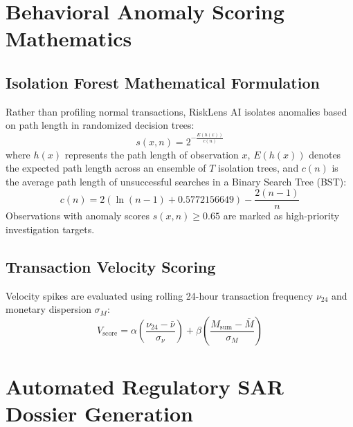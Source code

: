 \documentclass[12pt,a4paper]{report}
\begin{document}
\chapter{Behavioral Anomaly Scoring Mathematics}

\section{Isolation Forest Mathematical Formulation}
Rather than profiling normal transactions, RiskLens AI isolates anomalies based on path length in randomized decision trees:
\begin{equation}
s(x, n) = 2^{-\frac{E(h(x))}{c(n)}}
\end{equation}
where $h(x)$ represents the path length of observation $x$, $E(h(x))$ denotes the expected path length across an ensemble of $T$ isolation trees, and $c(n)$ is the average path length of unsuccessful searches in a Binary Search Tree (BST):
\begin{equation}
c(n) = 2 \left( \ln(n - 1) + 0.5772156649 \right) - \frac{2(n - 1)}{n}
\end{equation}
Observations with anomaly scores $s(x, n) \ge 0.65$ are marked as high-priority investigation targets.

\section{Transaction Velocity Scoring}
Velocity spikes are evaluated using rolling 24-hour transaction frequency $\nu_{24}$ and monetary dispersion $\sigma_M$:
\begin{equation}
V_{\text{score}} = \alpha \left( \frac{\nu_{24} - \bar{\nu}}{\sigma_{\nu}} \right) + \beta \left( \frac{M_{\text{sum}} - \bar{M}}{\sigma_M} \right)
\end{equation}

\chapter{Automated Regulatory SAR Dossier Generation}
\end{document}
